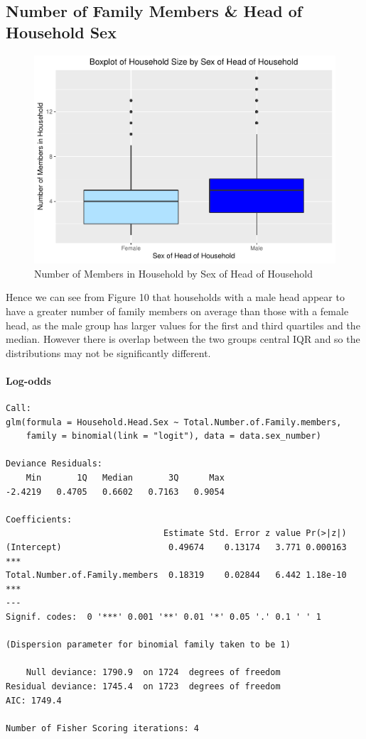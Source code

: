 \documentclass[
]{article}
\begin{document}
\hypertarget{number-of-family-members-head-of-household-sex}{%
\subsection{Number of Family Members \& Head of Household
Sex}\label{number-of-family-members-head-of-household-sex}}

\begin{figure}[H]

{\centering \includegraphics[width=0.8\linewidth]{Group_01_Project2_demo_files/figure-latex/boxplot of sex and members-1} 

}

\caption{Number of Members in Household by Sex of Head of Household}\label{fig:boxplot of sex and members}
\end{figure}

Hence we can see from Figure 10 that households with a male head appear
to have a greater number of family members on average than those with a
female head, as the male group has larger values for the first and third
quartiles and the median. However there is overlap between the two
groups central IQR and so the distributions may not be significantly
different.

\hypertarget{log-odds}{%
\paragraph{Log-odds}\label{log-odds}}

\begin{verbatim}
Call:
glm(formula = Household.Head.Sex ~ Total.Number.of.Family.members, 
    family = binomial(link = "logit"), data = data.sex_number)

Deviance Residuals: 
    Min       1Q   Median       3Q      Max  
-2.4219   0.4705   0.6602   0.7163   0.9054  

Coefficients:
                               Estimate Std. Error z value Pr(>|z|)    
(Intercept)                     0.49674    0.13174   3.771 0.000163 ***
Total.Number.of.Family.members  0.18319    0.02844   6.442 1.18e-10 ***
---
Signif. codes:  0 '***' 0.001 '**' 0.01 '*' 0.05 '.' 0.1 ' ' 1

(Dispersion parameter for binomial family taken to be 1)

    Null deviance: 1790.9  on 1724  degrees of freedom
Residual deviance: 1745.4  on 1723  degrees of freedom
AIC: 1749.4

Number of Fisher Scoring iterations: 4
\end{verbatim}
\end{document}

